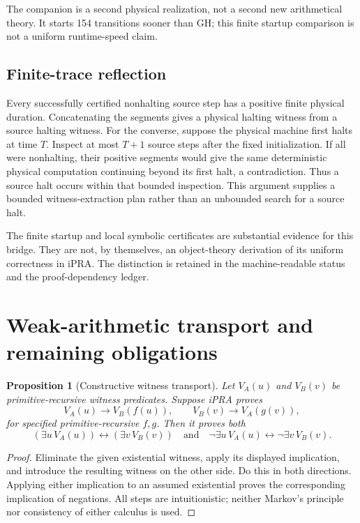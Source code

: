 \documentclass[11pt,letterpaper]{article}
\newtheorem{proposition}[theorem]{Proposition}
\begin{document}
The companion is a second physical realization, not a second new
arithmetical theory. It starts 154 transitions sooner than GH; this finite
startup comparison is not a uniform runtime-speed claim.

\subsection{Finite-trace reflection}

Every successfully certified nonhalting source step has a positive finite
physical duration. Concatenating the segments gives a physical halting
witness from a source halting witness. For the converse, suppose the
physical machine first halts at time $T$. Inspect at most $T+1$ source
steps after the fixed initialization. If all were nonhalting, their
positive segments would give the same deterministic physical computation
continuing beyond its first halt, a contradiction. Thus a source halt
occurs within that bounded inspection. This argument supplies a bounded
witness-extraction plan rather than an unbounded search for a source halt.

The finite startup and local symbolic certificates are substantial evidence
for this bridge. They are not, by themselves, an object-theory derivation
of its uniform correctness in iPRA. The distinction is retained in the
machine-readable status and the proof-dependency ledger.

\section{Weak-arithmetic transport and remaining obligations}
\label{sec:weak}

\begin{proposition}[Constructive witness transport]
Let $V_A(u)$ and $V_B(v)$ be primitive-recursive witness predicates.
Suppose iPRA proves
\[
 V_A(u)\to V_B(f(u)),\qquad V_B(v)\to V_A(g(v)),
\]
for specified primitive-recursive $f,g$. Then it proves both
\[
 (\exists u\,V_A(u))\leftrightarrow(\exists v\,V_B(v))
 \quad\text{and}\quad
 \neg\exists u\,V_A(u)\leftrightarrow\neg\exists v\,V_B(v).
\]
\end{proposition}
\begin{proof}
Eliminate the given existential witness, apply its displayed implication,
and introduce the resulting witness on the other side. Do this in both
directions. Applying either implication to an assumed existential proves
the corresponding implication of negations. All steps are intuitionistic;
neither Markov's principle nor consistency of either calculus is used.
\end{proof}
\end{document}
